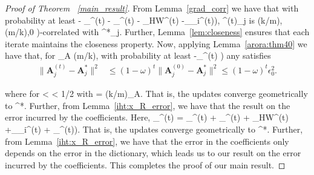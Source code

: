 \documentclass{article}
\newcommand{\HT}{{\c{T}}}
\newcommand{\gradvec}{\b{g}_i}
\newcommand{\gradmat}{\b{g}}
\def\[#1\]{{$#1$}}
\def\b#1{{\mathbf{#1}}}
\def\c#1{{\mathcal{#1}}}
\begin{document}
\begin{proof}[Proof of Theorem ~\ref{main_result}]
	 From Lemma~\ref{grad_corr} we have that with probability at least \[(1 - \delta_{\HT}^{(t)} - \delta_{\beta}^{(t)} - \delta_{\rm HW}^{(t)} -\delta_{\gradvec}^{(t)})\], \[\b{g}^{(t)}_j\] is \[(\Omega(k/m), \Omega(m/k),0 )\]-correlated with \[\b{A}^*_j\]. Further, Lemma~\ref{lem:closeness} ensures that each iterate maintains the closeness property. Now, applying Lemma~\ref{arora:thm40} we have that, for \[\eta_A \leq \Theta(m/k)\], with probability at least \[(1 -\delta_{}^{(t)} )\] any \[t \in [T]\] satisfies
	 \vspace{-5pt}
	 \begin{align*}
	 \|\b{A}^{(t)}_j- \b{A}^*_j\|^2
	 &\leq (1 - \omega)^{t}\|\b{A}^{(0)}_j- \b{A}^*_j\|^2 \leq (1 - \omega)^{t} \epsilon_0^2.
	 \end{align*}
	 
	 where for \[0 < \omega < 1/2\] with \[\omega = \Omega(k/m)\eta_A\]. That is, the updates converge geometrically to \[\b{A}^*\]. Further, from Lemma~\ref{iht:x_R_error}, we have that the  result on the error incurred by the coefficients. Here, \[\delta_{}^{(t)}  = \delta_{\HT}^{(t)} + \delta_{\beta}^{(t)} + \delta_{\rm HW}^{(t)} +\delta_{\gradvec}^{(t)} + \delta_{\gradmat}^{(t)})\]. That is, the updates converge geometrically to \[\b{A}^*\]. Further, from Lemma~\ref{iht:x_R_error}, we have that the error in the coefficients only depends on the error in the dictionary, which leads us to our result on the error incurred by the coefficients. This completes the proof of our main result. 
\end{proof}
\end{document}
